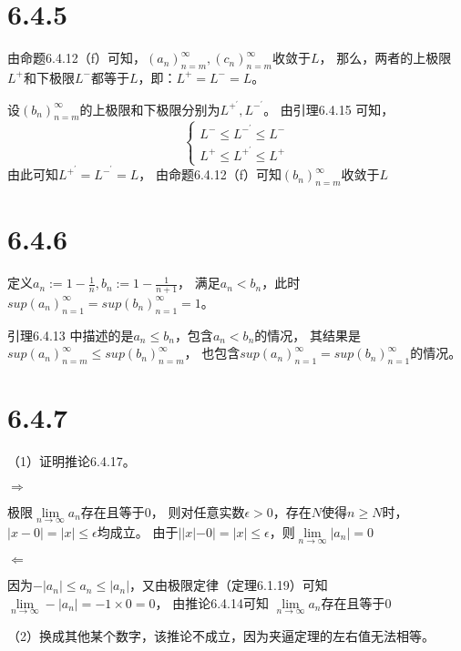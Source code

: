 \documentclass{article}
\theoremstyle{mystyle}
\begin{document}
\section*{6.4.5}

由命题6.4.12（f）可知，$(a_n)_{n=m}^\infty,(c_n)_{n=m}^\infty$收敛于$L$，
那么，两者的上极限$L^+$和下极限$L^-$都等于$L$，即：$L^+ = L^- = L$。

设$(b_n)_{n=m}^\infty$的上极限和下极限分别为$L^{+^\prime},L^{-^\prime}$。
由引理6.4.15 可知，
\begin{equation}
  \begin{cases*}
    L^- \leq L^{-^\prime} \leq L^- \\
    L^+ \leq L^{+^\prime} \leq L^+
  \end{cases*}
\end{equation}
由此可知$L^{+^\prime}=L^{-^\prime}=L$，
由命题6.4.12（f）可知$(b_n)_{n=m}^\infty$收敛于$L$

\section*{6.4.6}

定义$a_n := 1 - \frac{1}{n}, b_n := 1 - \frac{1}{n+1}$，
满足$a_n < b_n$，此时$sup(a_n)_{n=1}^\infty=sup(b_n)_{n=1}^\infty=1$。

引理6.4.13 中描述的是$a_n \leq b_n$，包含$a_n < b_n$的情况，
其结果是$sup(a_n)_{n=m}^\infty \leq sup(b_n)_{n=m}^\infty$，
也包含$sup(a_n)_{n=1}^\infty=sup(b_n)_{n=1}^\infty$的情况。

\section*{6.4.7}

（1）证明推论6.4.17。

\textbf{$\Rightarrow$}

极限$\lim \limits_{n \rightarrow \infty}a_n$存在且等于$0$，
则对任意实数$\epsilon > 0$，存在$N$使得$n \geq N$时，$|x - 0| = |x| \leq \epsilon$均成立。
由于$||x|-0| = |x| \leq \epsilon$，则$\lim \limits_{n \rightarrow \infty}|a_n| = 0$

\textbf{$\Leftarrow$}

因为$-|a_n| \leq a_n \leq |a_n|$，又由极限定律（定理6.1.19）可知
$\lim \limits_{n \rightarrow \infty}-|a_n|=-1 \times 0 = 0$，
由推论6.4.14可知 $\lim \limits_{n \rightarrow \infty}a_n$存在且等于$0$

（2）换成其他某个数字，该推论不成立，因为夹逼定理的左右值无法相等。
\end{document}
